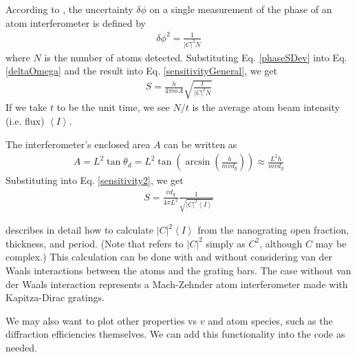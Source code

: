 \documentclass[twocolumn,pra,showpacs,superscriptaddress,longbibliography]{revtex4-1}   %
\newcommand{\avg}[1]{\left\langle #1 \right\rangle}
\begin{document}
According to \cite{Lenef1997}, the uncertainty $\delta\phi$ on a single measurement of the phase of an atom interferometer is defined by
\begin{align}
	\delta\phi^2 = \frac{1}{|C|^2N}
	\label{phaseSDev}
\end{align}
where $N$ is the number of atoms detected.
Substituting Eq. \ref{phaseSDev} into Eq. \ref{deltaOmega} and the result into Eq. \ref{sensitivityGeneral}, we get 
\begin{align}
	S = \frac{h}{4\pi m A} \sqrt{\frac{t}{|C|^2N}}
	\label{sensitivity2}
\end{align}
If we take $t$ to be the unit time, we see $N/t$ is the average atom beam intensity (i.e. flux) $\avg{I}$.

The interferometer's enclosed area $A$ can be written as
\begin{align}
	A = L^2\tan{\theta_d} = L^2\tan\left(\arcsin\left(\frac{h}{mvd_g}\right)\right) \approx \frac{L^2h}{mvd_g}
\end{align}
Substituting into Eq. \ref{sensitivity2}, we get
\begin{align}
	S = \frac{vd_g}{4\pi L^2} \frac{1}{ \sqrt{|C|^2\avg{I}}}
	\label{sensitivity3}
\end{align}


\cite{Cronin2005} describes in detail how to calculate $|C|^2\avg{I}$ from the nanograting open fraction, thickness, and period. (Note that \cite{Cronin2005} refers to $|C|^2$ simply as $C^2$, although $C$ may be complex.) This calculation can be done with and without considering van der Waals interactions between the atoms and the grating bars. The case without van der Waals interaction represents a Mach-Zehnder atom interferometer made with Kapitza-Dirac gratings.

We may also want to plot other properties vs $v$ and atom species, such as the diffraction efficiencies themselves. We can add this functionality into the code as needed.


\end{document}
